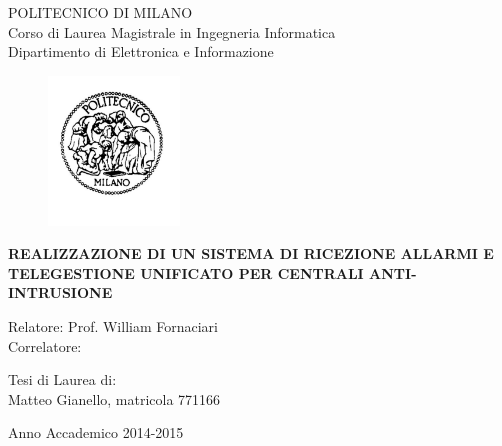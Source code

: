 \thispagestyle{empty}
\vspace*{-1.5cm} \bfseries{
\begin{center}
  \large
  POLITECNICO DI MILANO\\
  \normalsize
  Corso di Laurea Magistrale in Ingegneria Informatica\\
  Dipartimento di Elettronica e Informazione\\
  \begin{figure}[htbp]
    \begin{center}
      \includegraphics[width=3.5cm]{./pictures/logopm}
    \end{center}
  \end{figure}
  \vspace*{0.3cm} \LARGE



  \textbf{REALIZZAZIONE DI UN SISTEMA DI RICEZIONE ALLARMI E TELEGESTIONE UNIFICATO PER CENTRALI ANTI-INTRUSIONE}\\



  \vspace*{.75truecm} \large
\end{center}
\vspace*{3.0cm} \large
\begin{flushleft}


  Relatore: Prof. William Fornaciari \\
  Correlatore:  

\end{flushleft}
\vspace*{1.0cm}
\begin{flushright}


  Tesi di Laurea di:\\ Matteo Gianello, matricola 771166


\end{flushright}
\vspace*{0.5cm}
\begin{center}



  Anno Accademico 2014-2015
\end{center} \clearpage
}
